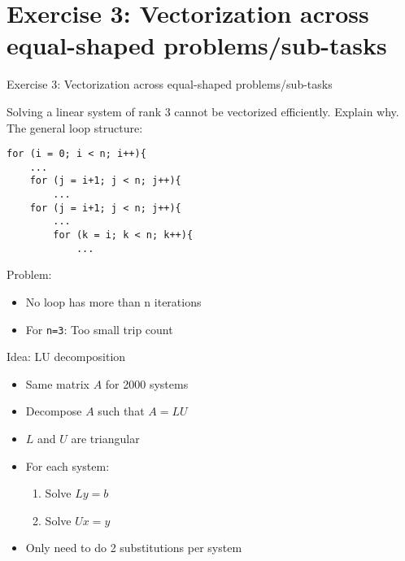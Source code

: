 \section{Exercise 3: Vectorization across equal-shaped problems/sub-tasks}

\begin{frame}{}
\begin{center}
{\Huge Exercise 3: Vectorization across equal-shaped problems/sub-tasks}
\end{center}
\end{frame}

\begin{frame}[fragile]{Solving a linear system of rank 3 cannot be vectorized efficiently. Explain why.}
The general loop structure:
\codestylec
\begin{lstlisting}
for (i = 0; i < n; i++){
    ...
    for (j = i+1; j < n; j++){
        ...
    for (j = i+1; j < n; j++){
        ...
        for (k = i; k < n; k++){
            ...                   
\end{lstlisting}
Problem:
\begin{itemize}
\item No loop has more than n iterations
\item For \texttt{n=3}: Too small trip count
\end{itemize}
\end{frame}

\begin{frame}{Idea: LU decomposition}
\begin{itemize}
\item Same matrix $A$ for 2000 systems
\item Decompose $A$ such that $A = LU$
\item $L$ and $U$ are triangular
\item For each system:
	\begin{enumerate}
	\item Solve $Ly = b$
	\item Solve $Ux = y$
	\end{enumerate}
\item Only need to do 2 substitutions per system
\end{itemize}
\end{frame}

